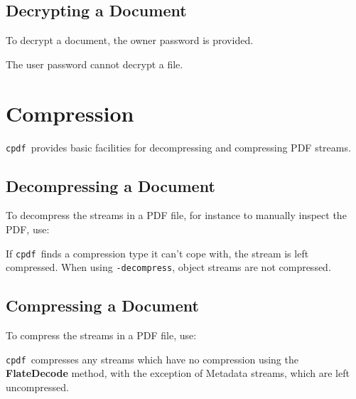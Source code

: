 \documentclass{book}
\newcommand{\cpdf}{\texttt{cpdf}}
\begin{document}
  \section{Decrypting a Document}
  To decrypt a document, the owner password is provided.

\noindent{}

  \noindent The user password cannot decrypt a file.

\chapter{Compression}

\noindent{}

  \cpdf\ provides basic facilities for decompressing and compressing PDF streams.
  \section{Decompressing a Document}
  To decompress the streams in a PDF file, for instance to manually inspect the
PDF, use:

\noindent{}

  \noindent If \cpdf\ finds a compression type it can't cope with, the stream is left compressed. When using \texttt{-decompress}, object streams are not compressed.
  \section{Compressing a Document}
  To compress the streams in a PDF file, use:

\noindent{}

  \noindent\cpdf\ compresses any streams which have no compression using the
  \textbf{Flate\-Decode} method, with the exception of Metadata streams, which
  are left uncompressed.
  
\end{document}
